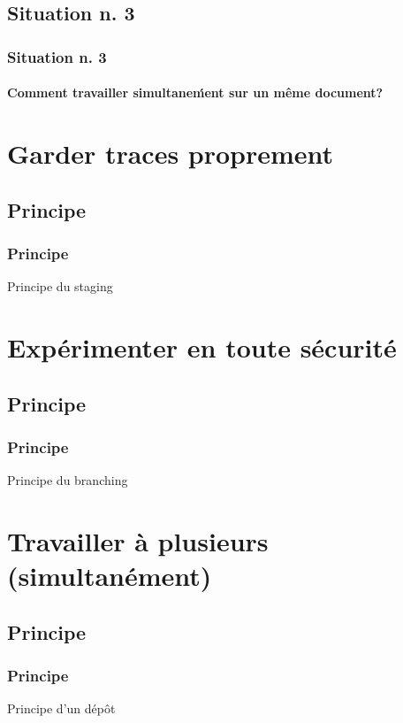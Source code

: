 \documentclass[t,11pt]{beamer}
\begin{document}
\subsection{Situation n. 3}
\begin{frame}[label=sit3]
        \frametitle{Situation n. 3}
        \framesubtitle{Comment travailler simultane\'ment sur un même document?}
\end{frame}

\section{Garder traces proprement}

\subsection{Principe}
\begin{frame}
        \frametitle{Principe}
        Principe du staging
\end{frame}

\section{Exp\'erimenter en toute s\'ecurit\'e}

\subsection{Principe}
\begin{frame}
        \frametitle{Principe}
        Principe du branching
\end{frame}

\section{Travailler \`a plusieurs (simultan\'ement) }

\subsection{Principe}
\begin{frame}
        \frametitle{Principe}
        Principe d'un d\'ep\^ot
\end{frame}
\end{document}
